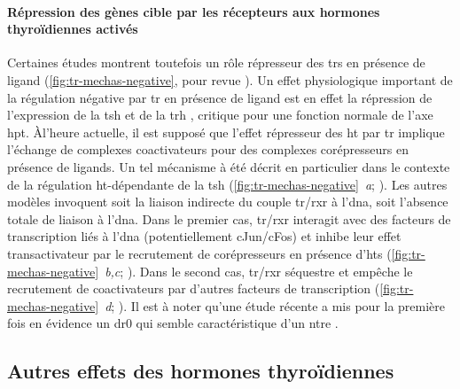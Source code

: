 \documentclass[../main.tex]{subfiles}
\begin{document}


\paragraph{Répression des gènes cible par les récepteurs aux hormones thyroïdiennes activés}
Certaines études montrent toutefois un rôle répresseur des \glspl{tr} en présence de ligand (\autoref{fig:tr-mechas-negative}, pour revue \citealp{Lazar2003,Weitzel2008}).
Un effet physiologique important de la régulation négative par \gls{tr} en présence de ligand est en effet la répression de l'expression de la \gls{tsh} et de la \gls{trh} \citep{Dupre2004}, critique pour une fonction normale de l'axe \gls{hpt}.
Àl'heure actuelle, il est supposé que l'effet répresseur des \gls{ht} par \gls{tr} implique l'échange de complexes coactivateurs pour des complexes corépresseurs en présence de ligands.
Un tel mécanisme à été décrit en particulier dans le contexte de la régulation \gls{ht}-dépendante de la \gls{tsh} (\autoref{fig:tr-mechas-negative}~\textit{a}; \citealp{Sasaki1999}).
Les autres modèles invoquent soit la liaison indirecte du couple \gls{tr}/\gls{rxr} à l'\gls{dna}, soit l'absence totale de liaison à l'\gls{dna}.
Dans le premier cas, \gls{tr}/\gls{rxr} interagit avec des facteurs de transcription liés à l'\gls{dna} (potentiellement cJun/cFos) et inhibe leur effet transactivateur par le recrutement de corépresseurs en présence d'\glspl{ht} (\autoref{fig:tr-mechas-negative}~\textit{b,c}; \citealp{Matsushita2007}).
Dans le second cas, \gls{tr}/\gls{rxr} séquestre et empêche le recrutement de coactivateurs par d'autres facteurs de transcription (\autoref{fig:tr-mechas-negative}~\textit{d}; \citealp{Wulf2008}).
Il est à noter qu'une étude récente a mis pour la première fois en évidence un \gls{dr0} qui semble caractéristique d'un \gls{ntre} \citep{Ramadoss2014}.




\subsection{Autres effets des hormones thyroïdiennes}
\end{document}
